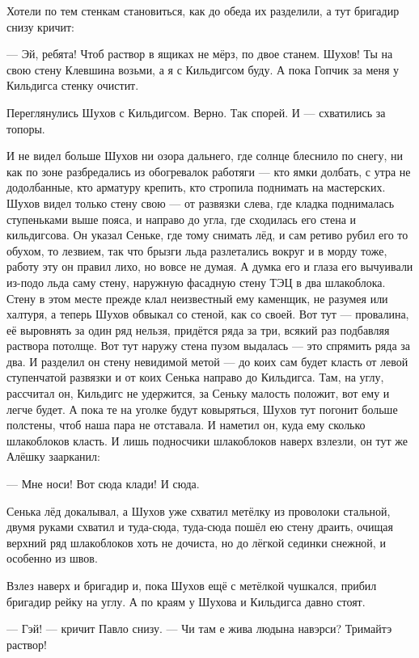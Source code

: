 Хотели по тем стенкам становиться, как до обеда их разделили, а тут бригадир снизу кричит:

--- Эй, ребята! Чтоб раствор в ящиках не мёрз, по двое станем. Шухов! Ты на свою стену Клевшина
возьми, а я с Кильдигсом буду. А пока Гопчик за меня у Кильдигса стенку очистит.

Переглянулись Шухов с Кильдигсом. Верно. Так спорей. И --- схватились за топоры.

И не видел больше Шухов ни озора дальнего, где солнце блеснило по снегу, ни как по зоне
разбредались из обогревалок работяги --- кто ямки долбать, с утра не додолбанные, кто
арматуру крепить, кто стропила поднимать на мастерских. Шухов видел только стену свою --- от
развязки слева, где кладка поднималась ступеньками выше пояса, и направо до угла, где
сходилась его стена и кильдигсова. Он указал Сеньке, где тому снимать лёд, и сам ретиво рубил
его то обухом, то лезвием, так что брызги льда разлетались вокруг и в морду тоже, работу эту
он правил лихо, но вовсе не думая. А думка его и глаза его вычуивали из-подо льда саму стену,
наружную фасадную стену ТЭЦ в два шлакоблока. Стену в этом месте прежде клал неизвестный ему
каменщик, не разумея или халтуря, а теперь Шухов обвыкал со стеной, как со своей. Вот тут ---
провалина, её выровнять за один ряд нельзя, придётся ряда за три, всякий раз подбавляя
раствора потолще. Вот тут наружу стена пузом выдалась --- это спрямить ряда за два. И разделил
он стену невидимой метой --- до коих сам будет класть от левой ступенчатой развязки и от коих
Сенька направо до Кильдигса. Там, на углу, рассчитал он, Кильдигс не удержится, за Сеньку
малость положит, вот ему и легче будет. А пока те на уголке будут ковыряться, Шухов тут
погонит больше полстены, чтоб наша пара не отставала. И наметил он, куда ему сколько
шлакоблоков класть. И лишь подносчики шлакоблоков наверх взлезли, он тут же Алёшку
заарканил:

--- Мне носи! Вот сюда клади! И сюда.

Сенька лёд докалывал, а Шухов уже схватил метёлку из проволоки стальной, двумя руками
схватил и туда-сюда, туда-сюда пошёл ею стену драить, очищая верхний ряд шлакоблоков хоть не
дочиста, но до лёгкой сединки снежной, и особенно из швов.

Взлез наверх и бригадир и, пока Шухов ещё с метёлкой чушкался, прибил бригадир рейку на углу.
А по краям у Шухова и Кильдигса давно стоят.

--- Гэй! --- кричит Павло снизу. --- Чи там е жива людына навэрси? Тримайтэ раствор!

